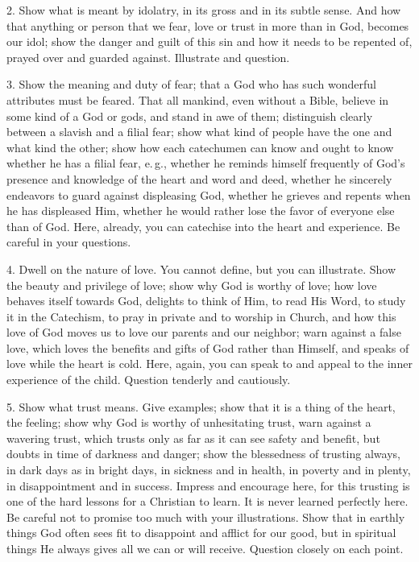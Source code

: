  2. Show what is meant by idolatry, in its gross and in its subtle sense. And how that anything or person that we fear, love or trust in more than in God, becomes our idol; show the danger and guilt of this sin and how it needs to be repented of, prayed over and guarded against. Illustrate and question.

 3. Show the meaning and duty of fear; that a God who has such wonderful attributes must be feared. That all mankind, even without a Bible, believe in some kind of a God or gods, and stand in awe of them; distinguish clearly between a slavish and a filial fear; show what kind of people have the one and what kind the other; show how each catechumen can know and ought to know whether he has a filial fear, e.\,g., whether he reminds himself frequently of God’s presence and knowledge of the heart and word and deed, whether he sincerely endeavors to guard against displeasing God, whether
he grieves and repents when he has displeased Him, whether he would rather lose the favor of everyone else than of God. Here, already, you can catechise into the heart and experience. Be careful in your questions.

 4. Dwell on the nature of love. You cannot define, but you can illustrate. Show the beauty and privilege of love; show why God is worthy of love; how love behaves itself towards God, delights to think of Him, to read His Word, to study it in the Catechism, to pray in private and to worship in Church, and how this love of God moves us to love our parents and our neighbor; warn against a false love, which loves the benefits and gifts of God rather than Himself, and speaks of love while the heart is cold. Here, again, you can speak to and appeal to the inner experience of the child. Question tenderly and cautiously.

 5. Show what trust means. Give examples; show that it is a thing of the heart, the feeling; show why God is worthy of unhesitating trust, warn against a wavering trust, which trusts only as far as it can see safety and benefit, but doubts in time of darkness and danger; show the blessedness of trusting always, in dark days as in bright days, in sickness and in health, in poverty and in plenty, in disappointment and in success. Impress and encourage here, for this trusting is one of the hard
lessons for a Christian to learn. It is never learned perfectly here. Be careful not to promise too much with your illustrations. Show that in earthly things God often sees fit to disappoint and afflict for our good, but in spiritual things He always gives all we can or will receive. Question closely on each point.

